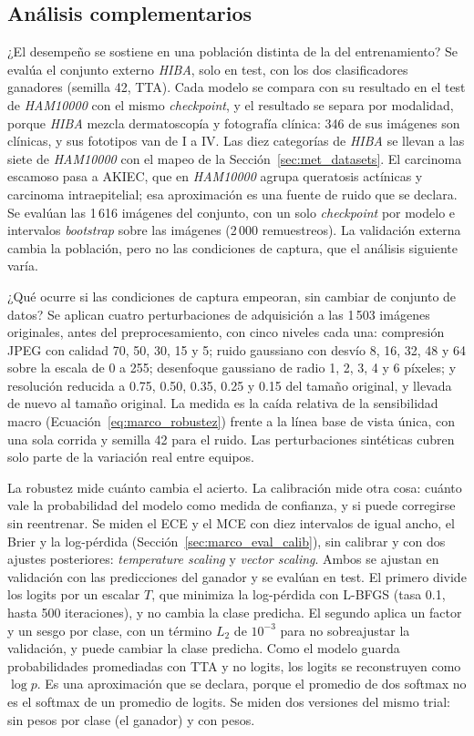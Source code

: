 \subsection{Análisis complementarios}
\label{sec:met_analisis_compl}

¿El desempeño se sostiene en una población distinta de la del entrenamiento? Se evalúa el conjunto externo \emph{HIBA},
solo en test, con los dos clasificadores ganadores (semilla 42, TTA). Cada modelo se compara con su resultado en el test de
\emph{HAM10000} con el mismo \emph{checkpoint}, y el resultado se separa por modalidad, porque \emph{HIBA} mezcla
dermatoscopía y fotografía clínica: 346 de sus imágenes son clínicas, y sus fototipos van de I a IV. Las diez categorías de
\emph{HIBA} se llevan a las siete de \emph{HAM10000} con el mapeo de la Sección~\ref{sec:met_datasets}. El carcinoma
escamoso pasa a AKIEC, que en \emph{HAM10000} agrupa queratosis actínicas y carcinoma intraepitelial; esa aproximación es
una fuente de ruido que se declara. Se evalúan las 1\,616 imágenes del conjunto, con un solo \emph{checkpoint} por
modelo e intervalos \emph{bootstrap} sobre las imágenes (2\,000 remuestreos). La validación externa cambia la
población, pero no las condiciones de captura, que el análisis siguiente varía.

¿Qué ocurre si las condiciones de captura empeoran, sin cambiar de conjunto de datos? Se aplican cuatro perturbaciones de
adquisición a las 1\,503 imágenes originales, antes del preprocesamiento, con cinco niveles cada una: compresión JPEG con
calidad 70, 50, 30, 15 y 5; ruido gaussiano con desvío 8, 16, 32, 48 y 64 sobre la escala de 0 a 255; desenfoque gaussiano
de radio 1, 2, 3, 4 y 6 píxeles; y resolución reducida a 0.75, 0.50, 0.35, 0.25 y 0.15 del tamaño original, y llevada de
nuevo al tamaño original. La medida es la caída relativa de la sensibilidad macro (Ecuación~\ref{eq:marco_robustez}) frente
a la línea base de vista única, con una sola corrida y semilla 42 para el ruido. Las perturbaciones sintéticas cubren solo
parte de la variación real entre equipos.

La robustez mide cuánto cambia el acierto. La calibración mide otra cosa: cuánto vale la probabilidad del modelo como medida
de confianza, y si puede corregirse sin reentrenar. Se miden el ECE y el MCE con diez intervalos de igual ancho, el Brier y
la log-pérdida (Sección~\ref{sec:marco_eval_calib}), sin calibrar y con dos ajustes posteriores: \emph{temperature
scaling} y \emph{vector scaling}. Ambos se ajustan en validación con las predicciones del ganador y se evalúan en test. El
primero divide los logits por un escalar $T$, que minimiza la log-pérdida con L-BFGS (tasa 0.1, hasta 500 iteraciones), y
no cambia la clase predicha. El segundo aplica un factor y un sesgo por clase, con un término $L_2$ de $10^{-3}$ para no
sobreajustar la validación, y puede cambiar la clase predicha. Como el modelo guarda probabilidades promediadas con TTA y no
logits, los logits se reconstruyen como $\log p$. Es una aproximación que se declara, porque el promedio de dos softmax no es
el softmax de un promedio de logits. Se miden dos versiones del mismo trial: sin pesos por clase (el ganador) y con pesos.

